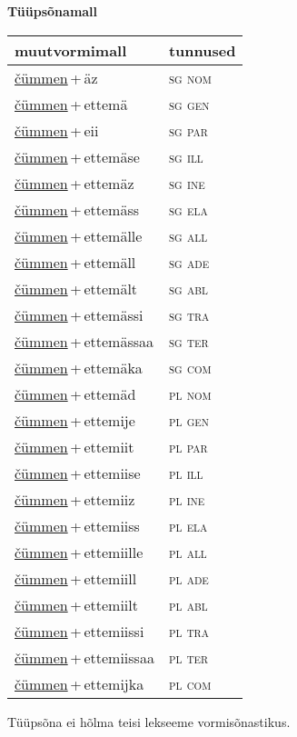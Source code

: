 
\vspace{1.8em}
\begin{minipage}{\textwidth}
\textbf{Tüüpsõnamall \,}\\

\begin{sideways}
\begin{tabular}{l l}
muutvormimall & tunnused \\
\hline
\underline{čümmen}\,+\,äz & \textsc{ sg nom } \\
\underline{čümmen}\,+\,ettemä & \textsc{ sg gen } \\
\underline{čümmen}\,+\,eii & \textsc{ sg par } \\
\underline{čümmen}\,+\,ettemäse & \textsc{ sg ill } \\
\underline{čümmen}\,+\,ettemäz & \textsc{ sg ine } \\
\underline{čümmen}\,+\,ettemäss & \textsc{ sg ela } \\
\underline{čümmen}\,+\,ettemälle & \textsc{ sg all } \\
\underline{čümmen}\,+\,ettemäll & \textsc{ sg ade } \\
\underline{čümmen}\,+\,ettemält & \textsc{ sg abl } \\
\underline{čümmen}\,+\,ettemässi & \textsc{ sg tra } \\
\underline{čümmen}\,+\,ettemässaa & \textsc{ sg ter } \\
\underline{čümmen}\,+\,ettemäka & \textsc{ sg com } \\
\underline{čümmen}\,+\,ettemäd & \textsc{ pl nom } \\
\underline{čümmen}\,+\,ettemije & \textsc{ pl gen } \\
\underline{čümmen}\,+\,ettemiit & \textsc{ pl par } \\
\underline{čümmen}\,+\,ettemiise & \textsc{ pl ill } \\
\underline{čümmen}\,+\,ettemiiz & \textsc{ pl ine } \\
\underline{čümmen}\,+\,ettemiiss & \textsc{ pl ela } \\
\underline{čümmen}\,+\,ettemiille & \textsc{ pl all } \\
\underline{čümmen}\,+\,ettemiill & \textsc{ pl ade } \\
\underline{čümmen}\,+\,ettemiilt & \textsc{ pl abl } \\
\underline{čümmen}\,+\,ettemiissi & \textsc{ pl tra } \\
\underline{čümmen}\,+\,ettemiissaa & \textsc{ pl ter } \\
\underline{čümmen}\,+\,ettemijka & \textsc{ pl com } \\
\end{tabular}
\end{sideways}
\label{tab:tüüpsõnamall-čümmenäz}

\end{minipage}

 
\vspace{1em}
\noindent Tüüpsõna ei hõlma teisi lekseeme vormi\-sõnastikus.
